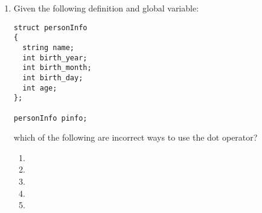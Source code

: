 \begin{enumerate}
\item Given the following  definition and global variable:

\noindent\begin{minipage}{\linewidth}\begin{lstlisting}
struct personInfo
{
  string name;
  int birth_year;
  int birth_month;
  int birth_day;
  int age;
};

personInfo pinfo;
\end{lstlisting}\end{minipage}

\noindent which of the following are incorrect ways to use the dot operator?
  \begin{enumerate}
	\item {}
	\item {}
	\item {}
  \item {}
	\item {}
  \end{enumerate}

\begin{comment}

\item Consider the following \Code{struct}:

\noindent\begin{minipage}{\linewidth}\begin{lstlisting}
struct personInfo
{
  string name;
  int birth_year;
  string birth_month;
  int birth_day;
  int age;
};
\end{lstlisting}\end{minipage}

Which of the following is the correct way to initialize the variables from the \Code{struct} above?

  \begin{enumerate}
	\item {\tiny \Code{personInfo info = \{"Michael", 1996, 3, 24, "sixteen"\};}}
	\item {\tiny \Code{personInfo info = \{"Michael", 1996, March, 24, 16\};} }
	\item {\tiny \Code{personInfo info = \{"Michael", 1996, "March", 24, 16\};}}
	\item {\tiny \Code{struct info = \{"Michael", 1996, "March", 24, 16\};} }
  \end{enumerate}
\end{comment}



\end{enumerate}
